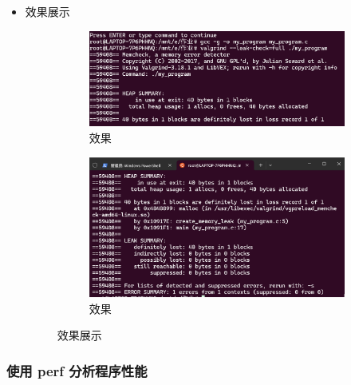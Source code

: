\documentclass[UTF8]{ctexart}
\begin{document}
\begin{enumerate}
\begin{itemize}
\begin{verbatim}
  \end{verbatim}
\item 效果展示
  \begin{figure}[H]
    \centering
    \begin{subfigure}[b]{0.48\textwidth}
        \includegraphics[width=\textwidth]{181} %
        \caption{效果}
        \label{fig:left}
    \end{subfigure}
    \hfill
    \begin{subfigure}[b]{0.48\textwidth}
        \includegraphics[width=\textwidth]{182} %
        \caption{效果}
        \label{fig:right}
    \end{subfigure}
    \caption{效果展示}
    \label{fig:side_by_side}
\end{figure}
  \end{itemize}
\end{enumerate}

\subsubsection{使用 perf 分析程序性能}
\end{document}
